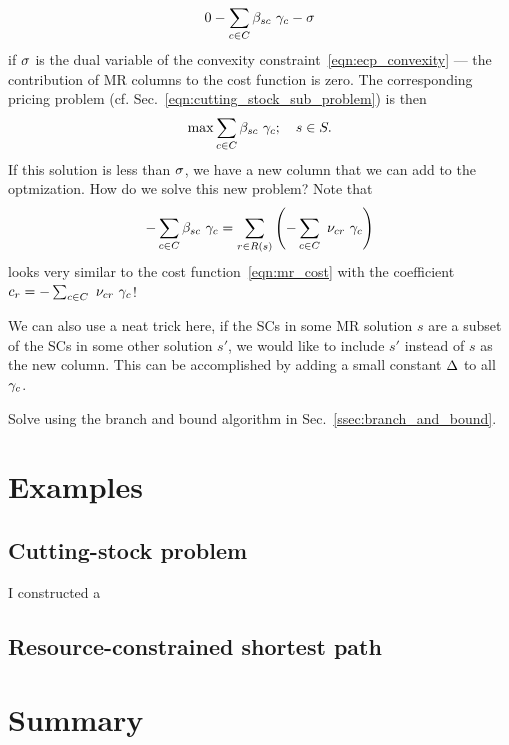 \documentclass[letterpaper, 10pt, twocolumn, reqno]{amsart}
\begin{document}
{\begin{enumerate}[(a)]
            $$
            0 - \sum_{c \in C} \beta_{sc}\ \gamma_c - \sigma
            $$
            if $\sigma$ is the dual variable of the convexity constraint~\eqref{eqn:ecp_convexity} --- the contribution of MR columns to the cost function is zero. The corresponding pricing problem (cf. Sec.~\ref{eqn:cutting_stock_sub_problem}) is then
            $$
            \max \sum_{c \in C} \beta_{sc}\ \gamma_c; \quad s \in S.
            $$
            If this solution is less than $\sigma$, we have a new column that we can add to the optmization. How do we solve this new problem? Note that
            $$
            -\sum_{c \in C} \beta_{sc}\ \gamma_c = \sum_{r \in R(s)} \left(-\sum_{c \in C}\ \nu_{cr}\ \gamma_c\right)
            $$
            looks very similar to the cost function~\eqref{eqn:mr_cost} with the coefficient $c_r = -\sum_{c \in C}\ \nu_{cr}\ \g_c$!

            We can also use a neat trick here, if the SCs in some MR solution $s$ are a subset of the SCs in some other solution $s'$, we would like to include $s'$ instead of $s$ as the new column. This can be accomplished by adding a small constant $\Delta$ to all $\gamma_c$.
        \end{enumerate}

    \item Solve using the branch and bound algorithm in Sec.~\ref{ssec:branch_and_bound}.

}

\section{Examples}
\label{sec:examples}

\subsection{Cutting-stock problem}
\label{ssec:eg_cutting_stock}

I constructed a


\subsection{Resource-constrained shortest path}
\label{ssec:eg_shortest_path}


\section{Summary}
\label{sec:summary}


{
\footnotesize


}
\end{document}
